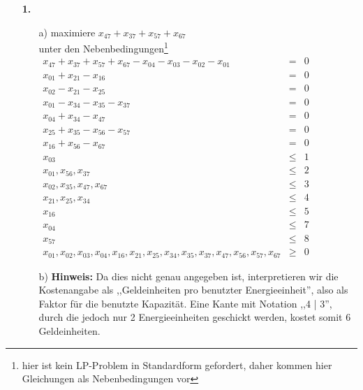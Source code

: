 \documentclass[a4paper,11pt]{article}
\author{\authorinfo}
\title{\titleinfo}
\date{\today}
\begin{document}
\maketitle
\begin{enumerate}
\item[\textbf{1.}]
    \begin{enumerate}
    \item[a)]
        maximiere \( x_{47} + x_{37} + x_{57} + x_{67} \)\\
        unter den Nebenbedingungen\footnote{hier ist kein LP-Problem in Standardform
        gefordert, daher kommen hier Gleichungen als Nebenbedingungen vor}\\
        \(\begin{array}{rcr}
            x_{47} + x_{37} + x_{57} + x_{67} - x_{04} - x_{03} - x_{02} - x_{01} &=& 0\\
            x_{01} + x_{21} - x_{16} &=& 0 \\
            x_{02} - x_{21} - x_{25} &=& 0 \\
            x_{01} - x_{34} - x_{35} - x_{37} &=& 0 \\
            x_{04} + x_{34} - x_{47} &=& 0 \\
            x_{25} + x_{35} - x_{56} - x_{57} &=& 0 \\
            x_{16} + x_{56} - x_{67} &=& 0 \\
            x_{03} &\leq& 1\\
            x_{01}, x_{56}, x_{37} &\leq& 2\\
            x_{02}, x_{35}, x_{47}, x_{67} &\leq& 3\\
            x_{21}, x_{25}, x_{34} &\leq& 4\\
            x_{16} &\leq& 5\\
            x_{04} &\leq& 7\\
            x_{57} &\leq& 8\\
            x_{01}, x_{02}, x_{03}, x_{04}, x_{16}, x_{21}, x_{25}, x_{34}, x_{35}, x_{37}, x_{47}, x_{56}, x_{57}, x_{67} &\geq& 0
        \end{array}\)

    \item[b)]
        \textbf{Hinweis:} Da dies nicht genau angegeben ist, interpretieren wir die Kostenangabe
        als ,,Geldeinheiten pro benutzter Energieeinheit'', also als Faktor für
        die benutzte Kapazität. Eine Kante mit Notation ,,4 | 3'', durch die
        jedoch nur 2 Energieeinheiten geschickt werden, kostet somit 6
        Geldeinheiten.


\end{enumerate}
\end{enumerate}
\end{document}
